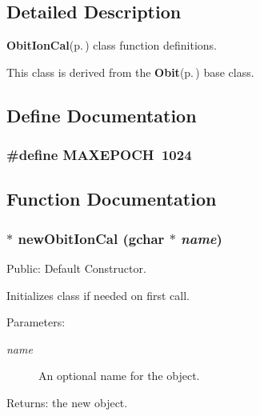 \subsection{Detailed Description}
{\bf Obit\-Ion\-Cal}{\rm (p.\,\pageref{structObitIonCal})} class function definitions. 

This class is derived from the {\bf Obit}{\rm (p.\,\pageref{structObit})} base class.

\subsection{Define Documentation}
\subsubsection{\setlength{\rightskip}{0pt plus 5cm}\#define MAXEPOCH\ 1024}\label{ObitIonCal_8c_a0}




\subsection{Function Documentation}
\subsubsection{$\ast$ new\-Obit\-Ion\-Cal (gchar $\ast$ {\em name})}\label{ObitIonCal_8c_a40}


Public: Default Constructor. 

Initializes class if needed on first call. \begin{Desc}
\item[Parameters:]
\begin{description}
\item[{\em name}]An optional name for the object. \end{description}
\end{Desc}
\begin{Desc}
\item[Returns:]the new object. \end{Desc}
